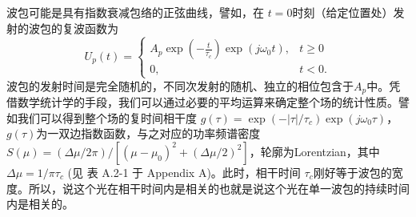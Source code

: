 \documentclass[UTF8]{ctexart}
\newcommand\crule[3][black]{\textcolor{#1}{\rule{#2}{#3}}}
\numberwithin{figure}{subsection}
\numberwithin{table}{subsection}
\begin{document}
波包可能是具有指数衰减包络的正弦曲线，譬如，在 $ t = 0 $时刻（给定位置处）发射的波包的复波函数为
\begin{equation}
U_p(t) = 
\begin{cases}
A_p \exp(-\frac{t}{\tau_c}) \exp(j \omega_0 t), & t\geq 0 \\
0, & t < 0 .
\end{cases}
\end{equation}
波包的发射时间是完全随机的，不同次发射的随机、独立的相位包含于$ A_p $中。凭借数学统计学的手段，我们可以通过必要的平均运算来确定整个场的统计性质。譬如我们可以得到整个场的复时间相干度 $ g(\tau) = \exp(- \lvert \tau \rvert / \tau_c) \exp(j \omega_0 \tau) $， $g(\tau)$为一双边指数函数，与之对应的功率频谱密度$ S(\mu) = (\Delta \mu /2 \pi)/ [(\mu - \mu_0)^2 + (\Delta \mu /2)^2] $，轮廓为Lorentzian，其中$ \Delta \mu = 1/ \pi \tau_c $ (见 表 A.2-1 于 Appendix A)。此时，相干时间 $ \tau_c $刚好等于波包的宽度。所以，说这个光在相干时间内是相关的也就是说这个光在单一波包的持续时间内是相关的。\\
\noindent{\crule[ksc]{\textwidth}{0.1cm}}

\bigbreak\begingroup
\color{ksc}
\end{document}
